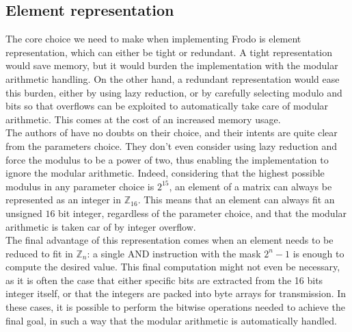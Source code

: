 \subsection{Element representation}
The core choice we need to make when implementing Frodo is element representation, which can either be tight or redundant. A tight representation would save memory, but it would burden the implementation with the modular arithmetic handling. On the other hand, a redundant representation would ease this burden, either by using lazy reduction, or by carefully selecting modulo and bits so that overflows can be exploited to automatically take care of modular arithmetic. This comes at the cost of an increased memory usage.\\
The authors of \cite{frodo} have no doubts on their choice, and their intents are quite clear from the parameters choice. They don't even consider using lazy reduction and force the modulus to be a power of two, thus enabling the implementation to ignore the modular arithmetic. Indeed, considering that the highest possible modulus in any parameter choice is $2^{15}$, an element of a matrix can always be represented as an integer in $\mathbb{Z}_{16}$. This means that an element can always fit an unsigned $16$ bit integer, regardless of the parameter choice, and that the modular arithmetic is taken car of by integer overflow.\\
The final advantage of this representation comes when an element needs to be reduced to fit in $\mathbb{Z}_n$: a single AND instruction with the mask $2^{n}-1$ is enough to compute the desired value. This final computation might not even be necessary, as it is often the case that either specific bits are extracted from the 16 bits integer itself, or that the integers are packed into byte arrays for transmission. In these cases, it is possible to perform the bitwise operations needed to achieve the final goal, in such a way that the modular arithmetic is automatically handled.\\

